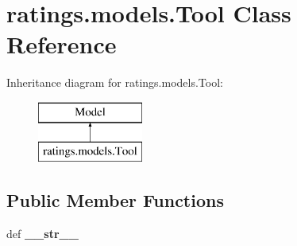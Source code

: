 \hypertarget{classratings_1_1models_1_1Tool}{\section{ratings.\-models.\-Tool Class Reference}
\label{classratings_1_1models_1_1Tool}
}
Inheritance diagram for ratings.\-models.\-Tool\-:\begin{figure}[H]
\begin{center}
\leavevmode
\includegraphics[height=2.000000cm]{classratings_1_1models_1_1Tool}
\end{center}
\end{figure}
\subsection*{Public Member Functions}
\begin{DoxyCompactItemize}
\item 
\hypertarget{classratings_1_1models_1_1Tool_a28bd2c668cea9a1f3eef17dbab22e619}{def {\bfseries \-\_\-\-\_\-str\-\_\-\-\_\-}}\label{classratings_1_1models_1_1Tool_a28bd2c668cea9a1f3eef17dbab22e619}

\end{DoxyCompactItemize}
